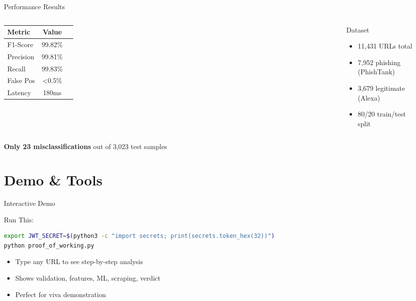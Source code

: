 \documentclass[10pt, aspectratio=169]{beamer}
\begin{document}
\begin{frame}{Performance Results}
    \begin{columns}[T]
        \begin{table}
            \tiny
            \centering
            \begin{tabular}{@{}lcc@{}}
                \toprule
                Metric & Value \\
                \midrule
                F1-Score & 99.82\% \\
                Precision & 99.81\% \\
                Recall & 99.83\% \\
                False Pos & <0.5\% \\
                Latency & 180ms \\
                \bottomrule
            \end{tabular}
        \end{table}
        
        \begin{exampleblock}{Dataset}
            \begin{itemize}
                \item 11,431 URLs total
                \item 7,952 phishing (PhishTank)
                \item 3,679 legitimate (Alexa)
                \item 80/20 train/test split
            \end{itemize}
        \end{exampleblock}
    \end{columns}
    
    \vspace{3mm}
    \textbf{Only 23 misclassifications} out of 3,023 test samples
\end{frame}

\section{Demo \& Tools}

\begin{frame}[fragile]{Interactive Demo}
    \begin{block}{Run This:}
        \begin{lstlisting}[language=bash, basicstyle=\ttfamily\footnotesize]
export JWT_SECRET=$(python3 -c "import secrets; print(secrets.token_hex(32))")
python proof_of_working.py
        \end{lstlisting}
    \end{block}
    
    \begin{itemize}
        \item Type any URL to see step-by-step analysis
        \item Shows validation, features, ML, scraping, verdict
        \item Perfect for viva demonstration
    \end{itemize}
\end{frame}
\end{document}
